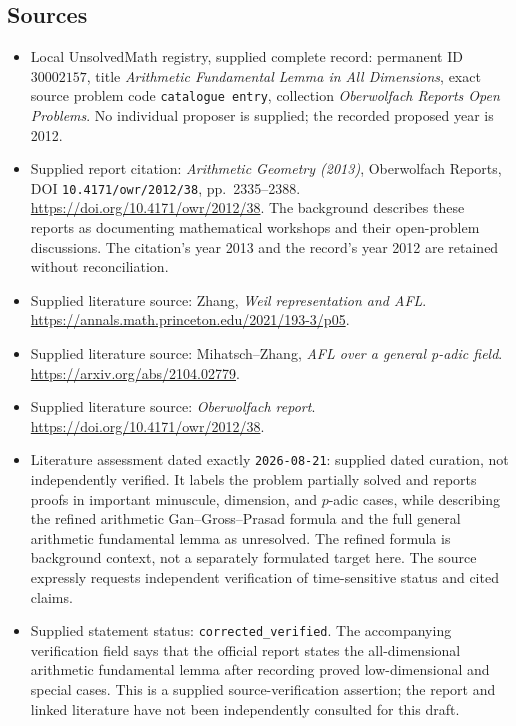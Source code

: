 \documentclass[11pt]{article}
\begin{document}
\subsection{Sources}
\begin{itemize}
\item Local UnsolvedMath registry, supplied complete record: permanent ID \(30002157\), title \emph{Arithmetic Fundamental Lemma in All Dimensions}, exact source problem code \texttt{catalogue entry}, collection \emph{Oberwolfach Reports Open Problems}. No individual proposer is supplied; the recorded proposed year is 2012.
\item Supplied report citation: \emph{Arithmetic Geometry (2013)}, Oberwolfach Reports, DOI \texttt{10.4171/owr/2012/38}, pp.\ 2335--2388. \url{https://doi.org/10.4171/owr/2012/38}. The background describes these reports as documenting mathematical workshops and their open-problem discussions. The citation's year 2013 and the record's year 2012 are retained without reconciliation.
\item Supplied literature source: Zhang, \emph{Weil representation and AFL}. \url{https://annals.math.princeton.edu/2021/193-3/p05}.
\item Supplied literature source: Mihatsch--Zhang, \emph{AFL over a general p-adic field}. \url{https://arxiv.org/abs/2104.02779}.
\item Supplied literature source: \emph{Oberwolfach report}. \url{https://doi.org/10.4171/owr/2012/38}.
\item Literature assessment dated exactly \texttt{2026-08-21}: supplied dated curation, not independently verified. It labels the problem partially solved and reports proofs in important minuscule, dimension, and \(p\)-adic cases, while describing the refined arithmetic Gan--Gross--Prasad formula and the full general arithmetic fundamental lemma as unresolved. The refined formula is background context, not a separately formulated target here. The source expressly requests independent verification of time-sensitive status and cited claims.
\item Supplied statement status: \texttt{corrected\_verified}. The accompanying verification field says that the official report states the all-dimensional arithmetic fundamental lemma after recording proved low-dimensional and special cases. This is a supplied source-verification assertion; the report and linked literature have not been independently consulted for this draft.
\end{itemize}
\end{document}
